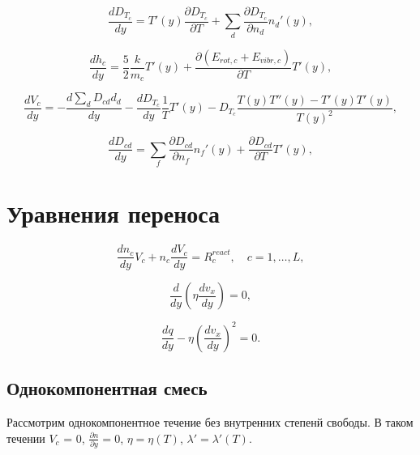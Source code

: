 \documentclass[12pt]{article}
\begin{document}
\begin{equation}
  \frac{d D_{T_{c}}}{d y} = T'(y) \frac{\partial D_{T_{c}}}{\partial T} + \sum_{d} \frac{\partial D_{T_{c}}}{\partial n_{d}} n_{d}'(y),
\end{equation}

\begin{equation}
  \frac{d h_{c}}{d y} = \frac{5}{2} \frac{k}{m_{c}}T'(y) + \frac{\partial \left(E_{rot,c} + E_{vibr,c} \right)}{\partial T}T'(y),
\end{equation}

\begin{equation}
  \frac{d V_{c}}{dy} = -\frac{d \sum_{d}D_{cd}d_{d}}{dy} - \frac{d D_{T_{c}}}{d y} \frac{1}{T} T'(y) - D_{T_{c}} \frac{T(y)T''(y) - T'(y)T'(y)}{T(y)^2},
\end{equation}

\begin{equation}
  \frac{d D_{cd}}{dy} = \sum_{f}\frac{\partial D_{cd}}{\partial n_{f}}n_{f}'(y) + \frac{\partial D_{cd}}{\partial T}T'(y),
\end{equation}

\section{Уравнения переноса}

\begin{equation}
  \frac{d n_{c}}{d y} V_{c} + n_{c}\frac{d V_{c}}{d y} = R_{c}^{react},\quad c=1,\ldots,L,\label{densityeqn}
\end{equation}

\begin{equation}
  \frac{d}{d y}\left(\eta \frac{d v_{x}}{d y} \right) = 0,\label{motioneqn}
\end{equation}

\begin{equation}
  \frac{d q}{d y} - \eta \left(\frac{d v_{x}}{d y} \right)^2 = 0.\label{energyeqn}
\end{equation}

\subsection{Однокомпонентная смесь}
Рассмотрим однокомпонентное течение без внутренних степенй свободы.
В таком течении $V_{c}$ = 0, $\frac{\partial n}{\partial y} = 0$, $\eta=\eta(T)$, $\lambda'=\lambda'(T)$.

\end{document}
